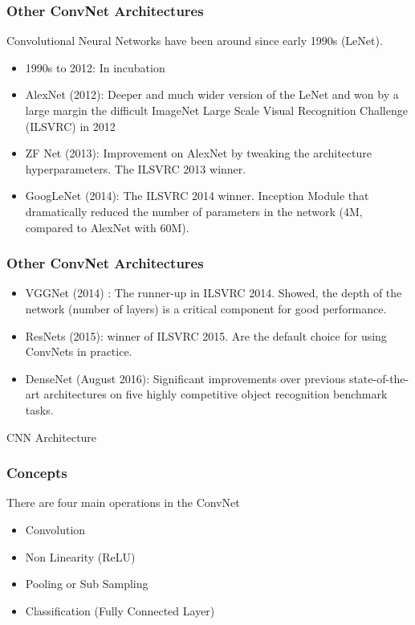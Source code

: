 \begin{frame}[fragile] \frametitle{Other ConvNet Architectures}
Convolutional Neural Networks have been around since early 1990s (LeNet).
\begin{itemize}
\item 1990s to 2012: In incubation
\item AlexNet (2012): Deeper and much wider version of the LeNet and won by a large margin the difficult ImageNet Large Scale Visual Recognition Challenge (ILSVRC) in 2012
\item ZF Net (2013): Improvement on AlexNet by tweaking the architecture hyperparameters. The ILSVRC 2013 winner.
\item GoogLeNet (2014): The ILSVRC 2014 winner. Inception Module that dramatically reduced the number of parameters in the network (4M, compared to AlexNet with 60M).
\end{itemize}
\end{frame}

\begin{frame}[fragile] \frametitle{Other ConvNet Architectures}
\begin{itemize}
\item VGGNet (2014) : The runner-up in ILSVRC 2014. Showed, the depth of the network (number of layers) is a critical component for good performance.
\item ResNets (2015): winner of ILSVRC 2015. Are the default choice for using ConvNets in practice.
\item DenseNet (August 2016): Significant improvements over previous state-of-the-art architectures on five highly competitive object recognition benchmark tasks.
\end{itemize}
\end{frame}


\begin{frame}
  \begin{center}
    {\Large CNN Architecture}
  \end{center}
\end{frame}

\begin{frame}[fragile] \frametitle{Concepts}
There are four main operations in the ConvNet 

\begin{itemize}
\item Convolution
\item Non Linearity (ReLU)
\item Pooling or Sub Sampling
\item Classification (Fully Connected Layer)
\end{itemize}
\end{frame}



